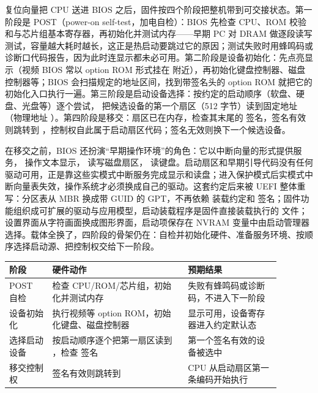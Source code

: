 复位向量把 CPU 送进 BIOS 之后，固件按四个阶段把整机带到可交接状态。第一阶段是 POST（power-on self-test，加电自检）：BIOS 先检查 CPU、ROM 校验和与芯片组基本寄存器，再初始化并测试内存——早期 PC 对 DRAM 做逐段读写测试，容量越大耗时越长，这正是热启动要跳过它的原因；测试失败时用蜂鸣码或诊断口代码报告，因为此时连显示都未必可用。第二阶段是设备初始化：先点亮显示（视频 BIOS 常以 option ROM 形式挂在  附近），再初始化键盘控制器、磁盘控制器等；BIOS 会扫描规定的地址区间，找到带签名头的 option ROM 就把它的初始化入口执行一遍。第三阶段是启动设备选择：按约定的启动顺序（软盘、硬盘、光盘等）逐个尝试， 把候选设备的第一个扇区（512 字节）读到固定地址 （物理地址 ）。第四阶段是移交：扇区已在内存，检查其末尾的  签名，签名有效则跳转到 ，控制权自此属于启动扇区代码；签名无效则换下一个候选设备。

在移交之前，BIOS 还扮演“早期操作环境”的角色：它以中断向量的形式提供服务， 操作文本显示， 读写磁盘扇区， 读键盘。启动扇区和早期引导代码没有任何驱动可用，正是靠这些实模式中断服务完成显示和读盘；进入保护模式后实模式中断向量表失效，操作系统才必须换成自己的驱动。这套约定后来被 UEFI 整体重写：分区表从 MBR 换成带 GUID 的 GPT，不再依赖  装载约定和  签名；固件功能组织成可扩展的驱动与应用模型，启动装载程序是固件直接装载执行的  文件；设置界面从字符画面换成图形界面，启动项保存在 NVRAM 变量中由启动管理器选择。载体全换了，四阶段的骨架仍在：自检并初始化硬件、准备服务环境、按顺序选择启动源、把控制权交给下一阶段。

\begin{longtable}{L{0.14\linewidth}L{0.44\linewidth}L{0.30\linewidth}}
\toprule
阶段 & 硬件动作 & 预期结果 \\
\midrule
POST 自检 & 检查 CPU/ROM/芯片组，初始化并测试内存 & 失败有蜂鸣码或诊断码，不进入下一阶段 \\\tablerowrule
设备初始化 & 执行视频等 option ROM，初始化键盘、磁盘控制器 & 显示可用，设备寄存器进入约定默认态 \\\tablerowrule
选择启动设备 & 按启动顺序逐个把第一扇区读到 ，检查  签名 & 第一个签名有效的设备被选中 \\\tablerowrule
移交控制权 & 签名有效则跳转到  & CPU 从启动扇区第一条编码开始执行 \\
\bottomrule
\end{longtable}

